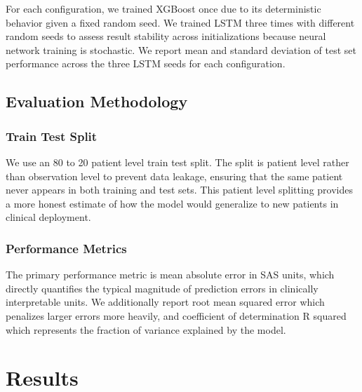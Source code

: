 \documentclass[11pt,a4paper]{article}
\begin{document}
For each configuration, we trained XGBoost once due to its deterministic
behavior given a fixed random seed. We trained LSTM three times with
different random seeds to assess result stability across initializations
because neural network training is stochastic. We report mean and
standard deviation of test set performance across the three LSTM seeds
for each configuration.

\subsection{Evaluation Methodology}

\subsubsection{Train Test Split}

We use an 80 to 20 patient level train test split. The split is patient
level rather than observation level to prevent data leakage, ensuring
that the same patient never appears in both training and test sets.
This patient level splitting provides a more honest estimate of how
the model would generalize to new patients in clinical deployment.

\subsubsection{Performance Metrics}

The primary performance metric is mean absolute error in SAS units,
which directly quantifies the typical magnitude of prediction errors
in clinically interpretable units. We additionally report root mean
squared error which penalizes larger errors more heavily, and
coefficient of determination R squared which represents the fraction
of variance explained by the model.

%
%

\section{Results}
\end{document}
